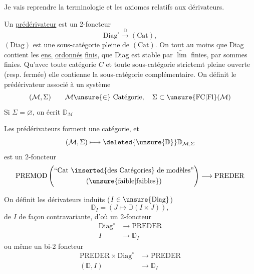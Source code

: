 
Je vais reprendre la terminologie et les axiomes relatifs aux dérivateurs.

Un \uline{prédérivateur} est un 2-foncteur
\[
 \mathrm{Diag}^{\circ}\xrightarrow{\mathbb D}(\mathrm{Cat}),
\]
$(\mathrm{Diag})$ est une sous-catégorie pleine de $(\mathrm{Cat})$. On  tout au moins que Diag contient les \uline{ens.} \uline{ordonnés} \uline{finis}, que Diag est stable par $\underleftarrow{\lim}$ finies, par sommes finies. Qu'avec toute catégorie $C$ et toute sous-catégorie strictemt pleine ouverte (resp. fermée) elle contienne la sous-catégorie complémentaire.
On définit le prédérivateur  associé à un système
\[
 (\mathcal M,\Sigma)\qquad \mathcal M\unsure{\in}\ \text{Catégorie},\quad\Sigma\subset\unsure{\mathrm{FC}|\mathrm{Fl}}(\mathcal M)
\]
Si $\Sigma=\varnothing$, on  écrit $\mathbb D_{\mathcal M}$

Les prédérivateurs forment une catégorie, et
\[
 (\mathcal M,\Sigma)\longmapsto\deleted{\unsure{\mathbb D}}\mathbb D_{\mathcal M,\Sigma}
\]
est un 2-foncteur
\[
 \mathrm{PREMOD}\left(\begin{gathered}\text{``Cat \inserted{des Catégories} de modèles''}\\ \text{(\unsure{faible|faibles})}\end{gathered}\right)\longrightarrow\mathrm{PREDER}
\]

 On définit les dérivateurs induits ($I\in\unsure{\mathrm{Diag}}$)
\[
 \mathbb D_I=(J\longmapsto\mathbb D(I\times J)),
\]
 de $I$ de façon contravariante, d'où un 2-foncteur
\[
 \begin{aligned}
 \mathrm{Diag}^{\circ}&\longrightarrow\mathrm{PREDER}\\
 I&\to\mathbb D_I
 \end{aligned}
\]
ou même un bi-2 foncteur
\[
 \begin{aligned}
 \mathrm{PREDER}\times\mathrm{Diag}^{\circ}&\longrightarrow\mathrm{PREDER}\\
 (\mathbb D,I)&\to\mathbb D_I
 \end{aligned}
\]

